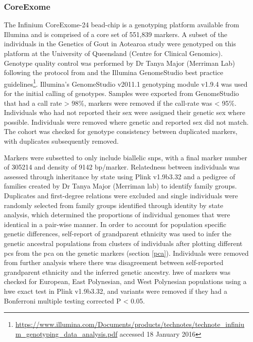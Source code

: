 \documentclass[]{report}
\begin{document}
\subsubsection{CoreExome}\label{coreExomeQC}

The Infinium CoreExome-24 bead-chip is a genotyping platform available
from Illumina and is comprised of a core set of 551,839 markers. A
subset of the individuals in the Genetics of Gout in Aotearoa study were
genotyped on this platform at the University of Queensland (Centre for
Clinical Genomics). Genotype quality control was performed by Dr Tanya
Major (Merriman Lab) following the protocol from \citet{Guo2014} and the
Illumina GenomeStudio best practice guidelines\footnote{\url{https://www.illumina.com/Documents/products/technotes/technote_infinium_genotyping_data_analysis.pdf}
  accessed 18 January 2016}. Illumina's GenomeStudio v2011.1 genotyping
module v1.9.4 was used for the initial calling of genotypes. Samples
were exported from GenomeStudio that had a call rate \textgreater{}
98\%, markers were removed if the call-rate was \textless{} 95\%.
Individuals who had not reported their sex were assigned their genetic
sex where possible. Individuals were removed where genetic and reported
sex did not match. The cohort was checked for genotype consistency
between duplicated markers, with duplicates subsequently removed.

Markers were subsetted to only include biallelic \glspl{snp}, with a
final marker number of 305214 and density of 9142 bp/marker. Relatedness
between individuals was assessed through inheritance by state using
Plink v1.9b3.32 and a pedigree of families created by Dr Tanya Major
(Merriman lab) to identify family groups. Duplicates and first-degree
relations were excluded and single individuals were randomly selected
from family groups identified through identity by state analysis, which
determined the proportions of individual genomes that were identical in
a pair-wise manner. In order to account for population specific genetic
differences, self-report of grandparent ethnicity was used to infer the
genetic ancestral populations from clusters of individuals after
plotting different \glspl{pc} from the \gls{pca} on the genetic markers
(section \ref{pca}). Individuals were removed from further analysis
where there was disagreement between self-reported grandparent ethnicity
and the inferred genetic ancestry. \Glsdesc{hwe} of markers was checked
for European, East Polynesian, and West Polynesian populations using a
\gls{hwe} exact test \citep{Wigginton2005} in Plink v1.9b3.32, and
variants were removed if they had a Bonferroni multiple testing
corrected P \textless{} 0.05.
\end{document}
